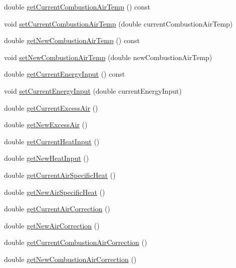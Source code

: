 \begin{DoxyCompactItemize}
double \hyperlink{class_efficiency_improvement_aa2f9d297f3c31e249c7a8035fd5602f1}{get\+Current\+Combustion\+Air\+Temp} () const
\item 
void \hyperlink{class_efficiency_improvement_a2fba09e47828dd8e6278251be8d1fa72}{set\+Current\+Combustion\+Air\+Temp} (double current\+Combustion\+Air\+Temp)
\item 
double \hyperlink{class_efficiency_improvement_a6a699fe87fec378962c2ee1505600dce}{get\+New\+Combustion\+Air\+Temp} () const
\item 
void \hyperlink{class_efficiency_improvement_a93705877dfad913c6282fbd31e66c41a}{set\+New\+Combustion\+Air\+Temp} (double new\+Combustion\+Air\+Temp)
\item 
double \hyperlink{class_efficiency_improvement_a8fcbdd3085f0a8b1120fb699522fcc05}{get\+Current\+Energy\+Input} () const
\item 
void \hyperlink{class_efficiency_improvement_a72c247fcd3f7791566205ec783e13d81}{set\+Current\+Energy\+Input} (double current\+Energy\+Input)
\item 
double \hyperlink{class_efficiency_improvement_a42cd83e1c57f065077e31f21b3552a76}{get\+Current\+Excess\+Air} ()
\item 
double \hyperlink{class_efficiency_improvement_afda194c72ccc7332ba4331f87f971b77}{get\+New\+Excess\+Air} ()
\item 
double \hyperlink{class_efficiency_improvement_af43c4706cb5cd67ce58e9c4356e4564c}{get\+Current\+Heat\+Input} ()
\item 
double \hyperlink{class_efficiency_improvement_a89e8480c7d2477ee249e847d4669ee2e}{get\+New\+Heat\+Input} ()
\item 
double \hyperlink{class_efficiency_improvement_a0d8b0d8968802a7994784380be376dfb}{get\+Current\+Air\+Specific\+Heat} ()
\item 
double \hyperlink{class_efficiency_improvement_a71ab10ba190cb99edb85fcd7f679e721}{get\+New\+Air\+Specific\+Heat} ()
\item 
double \hyperlink{class_efficiency_improvement_a640d0f4f9ecc8267678aa85bbafba655}{get\+Current\+Air\+Correction} ()
\item 
double \hyperlink{class_efficiency_improvement_a0339daa6d9cfc25e8da4f9efef73b3d8}{get\+New\+Air\+Correction} ()
\item 
double \hyperlink{class_efficiency_improvement_af50c396ac8ee18f594d6e8b8814f056a}{get\+Current\+Combustion\+Air\+Correction} ()
\item 
double \hyperlink{class_efficiency_improvement_abcbe174b3f94a20679dff0f5bff6a330}{get\+New\+Combustion\+Air\+Correction} ()

\end{DoxyCompactItemize}
